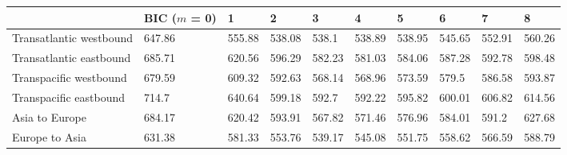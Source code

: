 
\begin{tabular}[t]{llllllllll}
\toprule
  & BIC ($m$ = 0) & 1 & 2 & 3 & 4 & 5 & 6 & 7 & 8\\
\midrule
Transatlantic westbound & 647.86 & 555.88 & 538.08 & 538.1 & 538.89 & 538.95 & 545.65 & 552.91 & 560.26\\
Transatlantic eastbound & 685.71 & 620.56 & 596.29 & 582.23 & 581.03 & 584.06 & 587.28 & 592.78 & 598.48\\
Transpacific westbound & 679.59 & 609.32 & 592.63 & 568.14 & 568.96 & 573.59 & 579.5 & 586.58 & 593.87\\
Transpacific eastbound & 714.7 & 640.64 & 599.18 & 592.7 & 592.22 & 595.82 & 600.01 & 606.82 & 614.56\\
Asia to Europe & 684.17 & 620.42 & 593.91 & 567.82 & 571.46 & 576.96 & 584.01 & 591.2 & 627.68\\
\addlinespace
Europe to Asia & 631.38 & 581.33 & 553.76 & 539.17 & 545.08 & 551.75 & 558.62 & 566.59 & 588.79\\
\bottomrule
\end{tabular}
